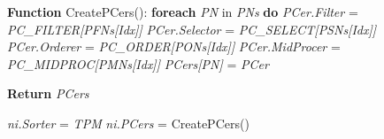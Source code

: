 \documentclass[journal]{IEEEtran}
\begin{document}
\begin{algorithm}
\begin{algorithmic}[1]
\State \textbf{Function} CreatePCers():
    \State \hspace{5mm} \textbf{foreach} \textit{PN} in \textit{PNs} \textbf{do}
        \State \hspace{10mm} \textit{PCer.Filter} = \textit{PC\_FILTER[PFNs[Idx]]}
        \State \hspace{10mm} \textit{PCer.Selector} = \textit{PC\_SELECT[PSNs[Idx]]}
        \State \hspace{10mm} \textit{PCer.Orderer} = \textit{PC\_ORDER[PONs[Idx]]}
        \State \hspace{10mm} \textit{PCer.MidProcer} = \textit{PC\_MIDPROC[PMNs[Idx]]}
        \State \hspace{10mm} \textit{PCers[PN]} = \textit{PCer}
        
    \State \hspace{5mm} \textbf{Return} \textit{PCers}

\State \textit{ni.Sorter} = \textit{TPM}
\State \textit{ni.PCers} = CreatePCers()

\end{algorithmic}
\end{algorithm}
\end{document}
